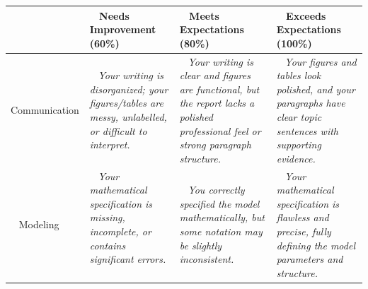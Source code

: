 \documentclass{article}
\begin{document}
        \vspace{5mm}
        \hspace{-15mm}
        \begin{tabular}{|>{\centering\arraybackslash}p{2.5cm}|>{\centering\arraybackslash}p{5cm}|>{\centering\arraybackslash}p{5cm}|>{\centering\arraybackslash}p{5cm}|}
          \hline
            ~
            \newline ~ & ~ \newline
            Needs Improvement (60\%)
            \newline ~ & ~ \newline
            Meets Expectations (80\%)
            \newline ~ & ~ \newline
            Exceeds Expectations (100\%)
            \newline ~\\
          \hline
          ~ \newline
          Communication
            \newline ~ & ~ \newline
            \it Your writing is disorganized; your figures/tables are messy, unlabelled, or difficult to interpret.
            \newline ~ & ~ \newline
            \it Your writing is clear and figures are functional, but the report lacks a polished professional feel or strong paragraph structure.
            \newline ~ & ~ \newline
            \it Your figures and tables look polished, and your paragraphs have clear topic sentences with supporting evidence.
            \newline ~\\
          \hline
          ~ \newline
          Modeling
            \newline ~ & ~ \newline
            \it Your mathematical specification is missing, incomplete, or contains significant errors.
            \newline ~ & ~ \newline
            \it You correctly specified the model mathematically, but some notation may be slightly inconsistent.
            \newline ~ & ~ \newline
            \it Your mathematical specification is flawless and precise, fully defining the model parameters and structure.

\end{tabular}
\end{document}

